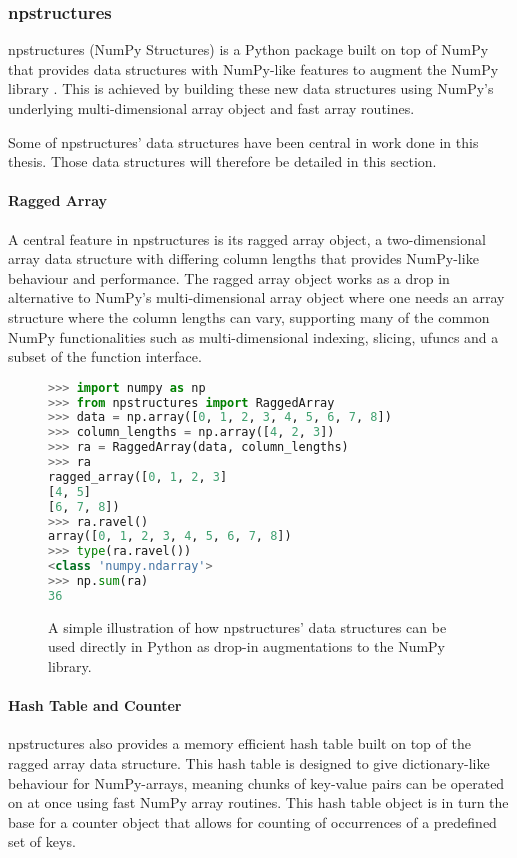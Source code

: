 \subsubsection{npstructures} \label{background:implementation_tools_and_libraries:npstructures}
npstructures (NumPy Structures) is a Python package built on top of NumPy that provides data structures with NumPy-like features to augment the NumPy library \cite{npstructures}.
This is achieved by building these new data structures using NumPy's underlying multi-dimensional array object and fast array routines.

Some of npstructures' data structures have been central in work done in this thesis.
Those data structures will therefore be detailed in this section.

\paragraph{Ragged Array}
A central feature in npstructures is its ragged array object, a two-dimensional array data structure with differing column lengths that provides NumPy-like behaviour and performance.
The ragged array object works as a drop in alternative to NumPy's multi-dimensional array object where one needs an array structure where the column lengths can vary, supporting many of the common NumPy functionalities such as multi-dimensional indexing, slicing, ufuncs and a subset of the function interface.
\begin{figure}[H]
\begin{lstlisting}[language=Python,style=console]
>>> import numpy as np
>>> from npstructures import RaggedArray
>>> data = np.array([0, 1, 2, 3, 4, 5, 6, 7, 8])
>>> column_lengths = np.array([4, 2, 3])
>>> ra = RaggedArray(data, column_lengths)
>>> ra
ragged_array([0, 1, 2, 3]
[4, 5]
[6, 7, 8])
>>> ra.ravel()
array([0, 1, 2, 3, 4, 5, 6, 7, 8])
>>> type(ra.ravel())
<class 'numpy.ndarray'>
>>> np.sum(ra)
36
\end{lstlisting}
\caption{
  A simple illustration of how npstructures' data structures can be used directly in Python as drop-in augmentations to the NumPy library.
}
\label{background:implementation_tools_and_libraries:npstructures:figure:ragged_array_example}
\end{figure}

\paragraph{Hash Table and Counter}
npstructures also provides a memory efficient hash table built on top of the ragged array data structure.
This hash table is designed to give dictionary-like behaviour for NumPy-arrays, meaning chunks of key-value pairs can be operated on at once using fast NumPy array routines.
This hash table object is in turn the base for a counter object that allows for counting of occurrences of a predefined set of keys.

